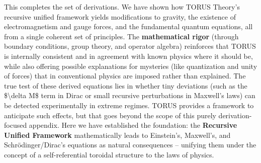 \documentclass[
]{article}
\begin{document}
This completes the set of derivations. We have shown how TORUS Theory's
recursive unified framework yields modifications to gravity, the
existence of electromagnetism and gauge forces, and the fundamental
quantum equations, all from a single coherent set of principles. The
\textbf{mathematical rigor} (through boundary conditions, group theory,
and operator algebra) reinforces that TORUS is internally consistent and
in agreement with known physics where it should be, while also offering
possible explanations for mysteries (like quantization and unity of
forces) that in conventional physics are imposed rather than explained.
The true test of these derived equations lies in whether tiny deviations
(such as the \$\textbackslash delta M\$ term in Dirac or small recursive
perturbations in Maxwell's laws) can be detected experimentally in
extreme regimes. TORUS provides a framework to anticipate such
effects\hspace{0pt}, but that goes beyond the scope of this purely
derivation-focused appendix. Here we have established the foundation:
the \textbf{Recursive Unified Framework} mathematically leads to
Einstein's, Maxwell's, and Schrödinger/Dirac's equations as natural
consequences -- unifying them under the concept of a self-referential
toroidal structure to the laws of physics.
\end{document}
